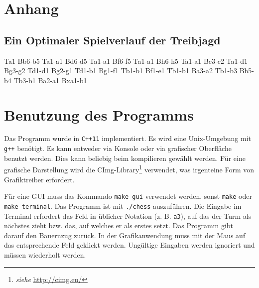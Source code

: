 \documentclass[a4paper, 11pt]{scrartcl}
\begin{document}
\newpage
\section*{Anhang}
\subsection*{Ein Optimaler Spielverlauf der Treibjagd}
\textsf{Ta1 Bb6-b5 Ta1-a1 Bd6-d5 Ta1-a1 Bf6-f5 Ta1-a1 Bh6-h5 Ta1-a1 Bc3-c2 Ta1-d1 Bg3-g2 Td1-d1 Bg2-g1 Td1-b1 Bg1-f1 Tb1-b1 Bf1-e1 Tb1-b1 Ba3-a2 Tb1-b3 Bb5-b4 Tb3-b1 Ba2-a1 Bxa1-b1}

\section*{Benutzung des Programms}
Das Programm wurde in \texttt{C++11} implementiert. Es wird eine Unix-Umgebung mit \texttt{g++} benötigt. Es kann entweder via Konsole oder via grafischer Oberfläche benutzt werden. Dies kann beliebig beim kompilieren gewählt werden. Für eine grafische Darstellung wird die CImg-Library\footnote{\emph{siehe} \url{http://cimg.eu/}} verwendet, was irgenteine Form von Grafiktreiber erfordert.

Für eine GUI muss das Kommando \texttt{make gui} verwendet werden, sonst \texttt{make} oder \texttt{make terminal}. Das Programm ist mit \texttt{./chess} auszuführen. Die Eingabe im Terminal erfordert das Feld in üblicher Notation (z. B. \texttt{a3}), auf das der Turm als nächstes zieht bzw. das, auf welches er als erstes setzt. Das Programm gibt darauf den Bauernzug zurück. In der Grafikanwendung muss mit der Maus auf das entsprechende Feld geklickt werden. Ungültige Eingaben werden ignoriert und müssen wiederholt werden.
\end{document}

